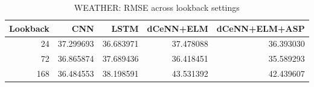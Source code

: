 \begin{table}
\caption{WEATHER: RMSE across lookback settings}
\begin{tabular}{rrrrr}
\toprule
Lookback & CNN & LSTM & dCeNN+ELM & dCeNN+ELM+ASP \\
\midrule
24 & 37.299693 & 36.683971 & 37.478088 & 36.393030 \\
72 & 36.865874 & 37.689436 & 36.418451 & 35.589293 \\
168 & 36.484553 & 38.198591 & 43.531392 & 42.439607 \\
\bottomrule
\end{tabular}
\end{table}
